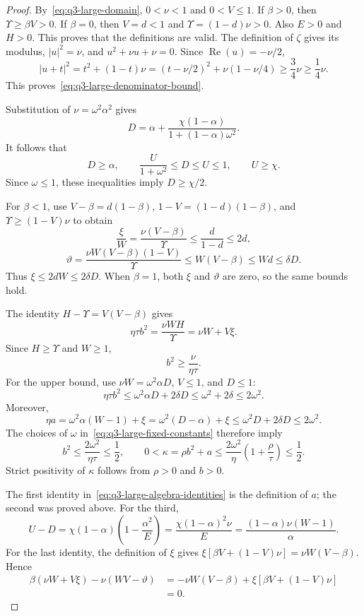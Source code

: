\begin{proof}
By~\eqref{eq:q3-large-domain}, \(0<\nu<1\) and \(0<V\le1\).
If \(\beta>0\), then \(\Upsilon\ge\beta V>0\).
If \(\beta=0\), then
\(V=d<1\) and \(\Upsilon=(1-d)\nu>0\).
Also \(E>0\) and \(H>0\). This proves that the definitions are valid.
The definition of \(\zeta\) gives its modulus, \(|u|^2=\nu\), and
\(u^2+\nu u+\nu=0\). Since
\(\operatorname{Re}(u)=-\nu/2\),
\[
|u+t|^2=t^2+(1-t)\nu
=(t-\nu/2)^2+\nu(1-\nu/4)
\ge\frac34\nu\ge\frac14\nu.
\]
This proves~\eqref{eq:q3-large-denominator-bound}.

Substitution of \(\nu=\omega^2\alpha^2\) gives
\[
D=\alpha+
\frac{\chi(1-\alpha)}{1+(1-\alpha)\omega^2}.
\]
It follows that
\[
D\ge\alpha,\qquad
\frac{U}{1+\omega^2}\le D\le U\le1,
\qquad U\ge\chi.
\]
Since \(\omega\le1\), these inequalities imply \(D\ge\chi/2\).

For \(\beta<1\), use
\(V-\beta=d(1-\beta)\),
\(1-V=(1-d)(1-\beta)\), and
\(\Upsilon\ge(1-V)\nu\) to obtain
\[
\frac{\xi}{W}
=\frac{\nu(V-\beta)}{\Upsilon}
\le\frac{d}{1-d}\le2d,
\]
\[
\vartheta
=\frac{\nu W(V-\beta)(1-V)}{\Upsilon}
\le W(V-\beta)\le Wd\le\delta D.
\]
Thus \(\xi\le2dW\le2\delta D\).
When \(\beta=1\), both \(\xi\) and \(\vartheta\) are zero, so the
same bounds hold.

The identity \(H-\Upsilon=V(V-\beta)\) gives
\[
\eta\tau b^2
=\frac{\nu WH}{\Upsilon}
=\nu W+V\xi.
\]
Since \(H\ge\Upsilon\) and \(W\ge1\),
\[
b^2\ge\frac{\nu}{\eta\tau}.
\]
For the upper bound, use \(\nu W=\omega^2\alpha D\),
\(V\le1\), and \(D\le1\):
\[
\eta\tau b^2
\le\omega^2\alpha D+2\delta D
\le\omega^2+2\delta\le2\omega^2.
\]
Moreover,
\[
\eta a
=\omega^2\alpha(W-1)+\xi
=\omega^2(D-\alpha)+\xi
\le\omega^2D+2\delta D\le2\omega^2.
\]
The choices of \(\omega\) in~\eqref{eq:q3-large-fixed-constants}
therefore imply
\[
b^2\le\frac{2\omega^2}{\eta\tau}\le\frac12,
\qquad
0<\kappa=\rho b^2+a
\le\frac{2\omega^2}{\eta}\left(1+\frac{\rho}{\tau}\right)
\le\frac12.
\]
Strict positivity of \(\kappa\) follows from \(\rho>0\) and \(b>0\).

The first identity in~\eqref{eq:q3-large-algebra-identities} is the
definition of \(a\); the second was proved above. For the third,
\[
U-D
=\chi(1-\alpha)\left(1-\frac{\alpha^2}{E}\right)
=\frac{\chi(1-\alpha)^2\nu}{E}
=\frac{(1-\alpha)\nu(W-1)}{\alpha}.
\]
For the last identity, the definition of \(\xi\) gives
\(\xi[\beta V+(1-V)\nu]=\nu W(V-\beta)\). Hence
\[
\begin{aligned}
\beta(\nu W+V\xi)-\nu(WV-\vartheta)
&=-\nu W(V-\beta)+\xi[\beta V+(1-V)\nu]\\
&=0.
\end{aligned}
\]
\end{proof}

